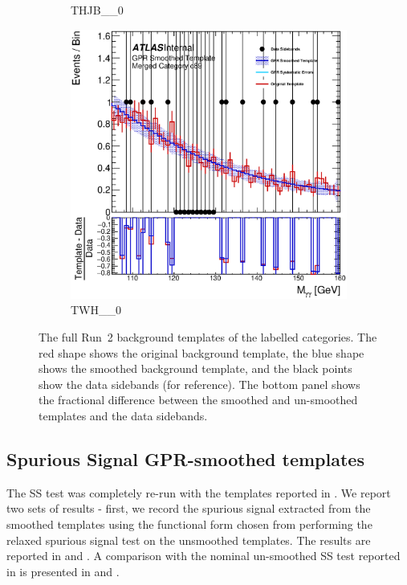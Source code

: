 \begin{figure}
\begin{center}
\begin{subfigure}[T]{0.49\linewidth}
	\caption{THJB\_\_0}
\end{subfigure}
\begin{subfigure}[T]{0.49\linewidth}
	\centering
	\includegraphics[width=\linewidth]{figures/background/gpr/coupCatTemplates/GPR_Smoothed_Plot_hmgg_c89.eps}
	\caption{TWH\_\_0}
\end{subfigure}
\caption{The full Run~2 background templates of the labelled categories. The red shape shows the original background template, the blue shape shows the smoothed background template, and the black points show the data sidebands (for reference). The bottom panel shows the fractional difference between the smoothed and un-smoothed templates and the data sidebands. }
 \label{fig:gpr_coupcat_22}
 \end{center}
\end{figure}

\FloatBarrier



\subsection{Spurious Signal GPR-smoothed templates}
\label{ssec:GPR_SS}

The SS test was completely re-run with the templates reported in \Figrange{\ref{fig:gpr_coupcat_1}}{\ref{fig:gpr_coupcat_22}}. 
We report two sets of results - first, we record the spurious signal extracted from the smoothed templates using the functional form chosen from performing the relaxed spurious signal test on the unsmoothed templates. The results are reported in \Tab{\ref{tab:spurious_sig_gp}} and \Tab{\ref{tab:spurious_sig_gp2}}. A comparison with the nominal un-smoothed SS test {reported in \Sect{\ref{ssec:bck_results}}} is presented in \Tab{\ref{tab:comp_smooth_unsmooth1}} and \Tab{\ref{tab:comp_smooth_unsmooth2}}.

